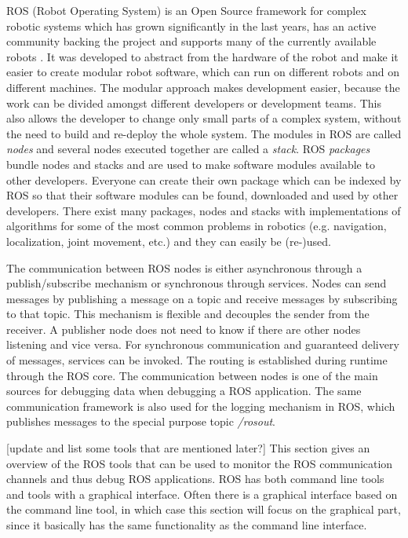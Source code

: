 ROS (Robot Operating System) \cite{Quigley2009} is an Open Source framework for complex robotic systems which has grown significantly in the last years, has an active community backing the project and supports many of the currently available robots \cite{Foote2012}. It was developed to abstract from the hardware of the robot and make it easier to create modular robot software, which can run on different robots and on different machines. The modular approach makes development easier, because the work can be divided amongst different developers or development teams. This also allows the developer to change only small parts of a complex system, without the need to build and re-deploy the whole system.
The modules in ROS are called \emph{nodes} and several nodes executed together are called a \emph{stack}. ROS \emph{packages} bundle nodes and stacks and are used to make software modules available to other developers. Everyone can create their own package which can be indexed by ROS so that their software modules can be found, downloaded and used by other developers. There exist many packages, nodes and stacks with implementations of algorithms for some of the most common problems in robotics (e.g. navigation, localization, joint movement, etc.) and they can easily be (re-)used.

The communication between ROS nodes is either asynchronous through a publish/subscribe mechanism or synchronous through services. Nodes can send messages by publishing a message on a topic and receive messages by subscribing to that topic. This mechanism is flexible and decouples the sender from the receiver. A publisher node does not need to know if there are other nodes listening and vice versa. For synchronous communication and guaranteed delivery of messages, services can be invoked. The routing is established during runtime through the ROS core. The communication between nodes is one of the main sources for debugging data when debugging a ROS application. The same communication framework is also used for the logging mechanism in ROS, which publishes messages to the special purpose topic \emph{/rosout}.

[update and list some tools that are mentioned later?]
This section gives an overview of the ROS tools that can be used to monitor the ROS communication channels and thus debug ROS applications. ROS has both command line tools and tools with a graphical interface. Often there is a graphical interface based on the command line tool, in which case this section will focus on the graphical part, since it basically has the same functionality as the command line interface.

